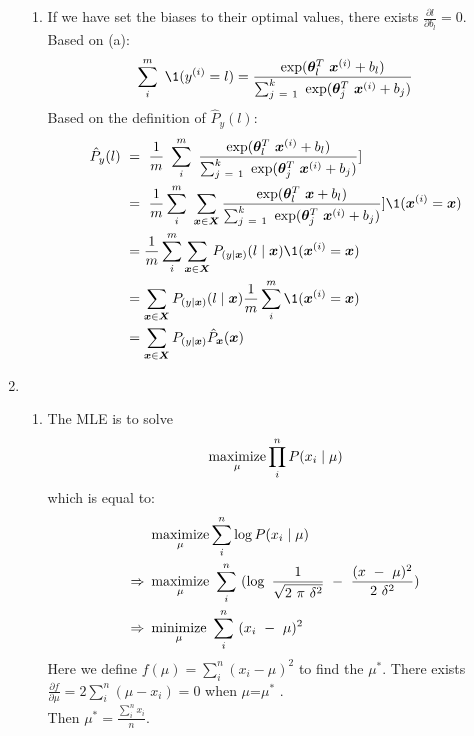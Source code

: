 \documentclass[a4paper]{article}
\begin{document}
\begin{enumerate}
\begin{enumerate}
  \item
  If we have set the biases to their optimal values, there exists $\frac{\partial l}{\partial b_l} = 0$.
  Based on (a):
  \begin{equation*}
    \sum_i^m \1 (y^{(i)}=l) = \frac{\exp(\boldsymbol{\theta}^T_l \boldsymbol x^{(i)}+b_l)}{\sum_{j = 1}^k \exp(\boldsymbol{\theta}^T_j \boldsymbol x^{(i)}+b_j)}
  \end{equation*}
  Based on the definition of $\hat{P}_y (l)$:
  \begin{equation*}
    \begin{aligned}
    \hat{P}_y (l) 
    &= \frac{1}{m} \sum_i^m \frac{\exp(\boldsymbol{\theta}^T_l \boldsymbol x^{(i)}+b_l)}{\sum_{j = 1}^k \exp(\boldsymbol \theta^T_j \boldsymbol x^{(i)}+b_j)}]\\
    &= \frac{1}{m} \sum_i^m \sum_{\boldsymbol x \in \boldsymbol X} \frac{\exp(\boldsymbol \theta^T_l \boldsymbol x+b_l)}{\sum_{j = 1}^k \exp(\boldsymbol \theta^T_j \boldsymbol x^{(i)}+b_j)}]\1 (\boldsymbol x^{(i)} = \boldsymbol x)\\
    &= \frac{1}{m} \sum_i^m \sum_{\boldsymbol x \in \boldsymbol X} P_{(y \mid \boldsymbol x)} (l \mid \boldsymbol x) \1 (\boldsymbol x^{(i)} = \boldsymbol x)\\
    &= \sum_{\boldsymbol x \in \boldsymbol X} P_{(y \mid \boldsymbol x)} (l \mid \boldsymbol x) \frac{1}{m} \sum_i^m \1 (\boldsymbol x^{(i)} = \boldsymbol x)\\
    &= \sum_{\boldsymbol x \in \boldsymbol X} P_{(y \mid \boldsymbol x)} \hat{P}_{\boldsymbol x} (\boldsymbol x) 
    \end{aligned}
  \end{equation*}
  \end{enumerate}  

\item
  \begin{enumerate}
  \item
    The MLE is to solve
    \begin{equation*}
      \operatorname*{maximize}_{\mu} \prod_i^n P(x_i \mid \mu)
    \end{equation*}
    which is equal to:
    \begin{equation*}
      \begin{aligned}
      &\maximize_{\mu} \sum_i^n \log P(x_i \mid \mu)\\
      \Rightarrow &\maximize_{\mu} \sum_i^n (\log \frac{1}{\sqrt{2 \pi \delta^2}} - \frac{(x - \mu)^2}{2 \delta^2})\\
      \Rightarrow &\minimize_{\mu} \sum_i^n (x_i - \mu)^2
      \end{aligned}
    \end{equation*}
    Here we define $f(\mu) = \sum_i^n (x_i - \mu)^2$ to find the $\mu^*$. There exists $\frac{\partial f}{\partial \mu} = 2\sum_i^n (\mu - x_i) = 0$ when $\mu$=$\mu^*$ .\\
    Then $\mu^* = \frac{\sum_i^n x_i}{n}$.


\end{enumerate}
\end{enumerate}
\end{document}
